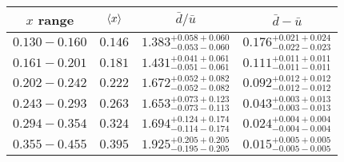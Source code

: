 {
\renewcommand{\arraystretch}{1.5}
\begin{tabular}{cccc}
	\hline
	$x$ range     & $\expval{x}$ & $\bar{d}/\bar{u}$                     & $\bar{d}-\bar{u}$                     \\ \hline
	$0.130-0.160$ & $0.146$      & $1.383^{+0.058+0.060}_{-0.053-0.060}$ & $0.176^{+0.021+0.024}_{-0.022-0.023}$ \\
	$0.161-0.201$ & $0.181$      & $1.431^{+0.041+0.061}_{-0.051-0.061}$ & $0.111^{+0.011+0.011}_{-0.011-0.011}$ \\
	$0.202-0.242$ & $0.222$      & $1.672^{+0.052+0.082}_{-0.052-0.082}$ & $0.092^{+0.012+0.012}_{-0.012-0.012}$ \\
	$0.243-0.293$ & $0.263$      & $1.653^{+0.073+0.123}_{-0.073-0.113}$ & $0.043^{+0.003+0.013}_{-0.003-0.013}$ \\
	$0.294-0.354$ & $0.324$      & $1.694^{+0.124+0.174}_{-0.114-0.174}$ & $0.024^{+0.004+0.004}_{-0.004-0.004}$ \\
	$0.355-0.455$ & $0.395$      & $1.925^{+0.205+0.205}_{-0.195-0.205}$ & $0.015^{+0.005+0.005}_{-0.005-0.005}$ \\ \hline
\end{tabular}
}
